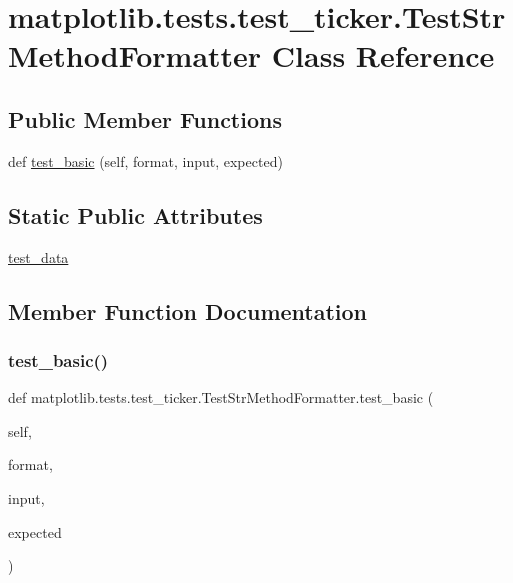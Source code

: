 \hypertarget{classmatplotlib_1_1tests_1_1test__ticker_1_1TestStrMethodFormatter}{}\section{matplotlib.\+tests.\+test\+\_\+ticker.\+Test\+Str\+Method\+Formatter Class Reference}
\label{classmatplotlib_1_1tests_1_1test__ticker_1_1TestStrMethodFormatter}
\subsection*{Public Member Functions}
\begin{DoxyCompactItemize}
\item 
def \hyperlink{classmatplotlib_1_1tests_1_1test__ticker_1_1TestStrMethodFormatter_a5e16d1ee345ed81622fc8525250bdbeb}{test\+\_\+basic} (self, format, input, expected)
\end{DoxyCompactItemize}
\subsection*{Static Public Attributes}
\begin{DoxyCompactItemize}
\item 
\hyperlink{classmatplotlib_1_1tests_1_1test__ticker_1_1TestStrMethodFormatter_a28e23897d1bb26d0aac53136269579d4}{test\+\_\+data}
\end{DoxyCompactItemize}


\subsection{Member Function Documentation}
\mbox{\label{classmatplotlib_1_1tests_1_1test__ticker_1_1TestStrMethodFormatter_a5e16d1ee345ed81622fc8525250bdbeb}} 
\subsubsection{\texorpdfstring{test\+\_\+basic()}{test\_basic()}}
{\footnotesize\ttfamily def matplotlib.\+tests.\+test\+\_\+ticker.\+Test\+Str\+Method\+Formatter.\+test\+\_\+basic (\begin{DoxyParamCaption}\item[{}]{self,  }\item[{}]{format,  }\item[{}]{input,  }\item[{}]{expected }\end{DoxyParamCaption})}



